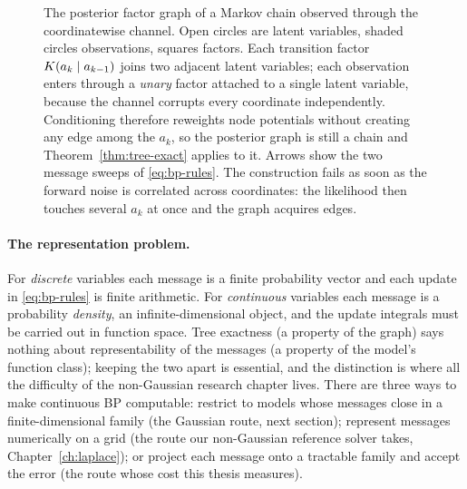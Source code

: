 \begin{figure}[t]\centering
{}
\caption[Posterior factor graph of a noised Markov chain]{The posterior factor
graph of a Markov chain observed through the coordinatewise channel. Open
circles are latent variables, shaded circles observations, squares factors. Each
transition factor $K(a_k \mid a_{k-1})$ joins two adjacent latent
variables; each observation enters through a \emph{unary} factor attached to a
single latent variable, because the channel corrupts every coordinate
independently. Conditioning therefore reweights node potentials without creating
any edge among the $a_k$, so the posterior graph is still a chain and
Theorem~\ref{thm:tree-exact} applies to it. Arrows show the two message sweeps
of \eqref{eq:bp-rules}. The construction fails as soon as the forward noise is
correlated across coordinates: the likelihood then touches several $a_k$ at
once and the graph acquires edges.}
\label{fig:posterior-factor-graph}
\end{figure}

\paragraph{The representation problem.} For \emph{discrete} variables
each message is a finite probability vector and each update in
\eqref{eq:bp-rules} is finite arithmetic. For \emph{continuous} variables
each message is a probability \emph{density}, an infinite-dimensional
object, and the update integrals must be carried out in function space.
Tree exactness (a property of the graph) says nothing about
representability of the messages (a property of the model's function
class); keeping the two apart is essential, and the distinction is where
all the difficulty of the non-Gaussian research chapter lives. There are
three ways to make continuous BP computable: restrict to models whose
messages close in a finite-dimensional family (the Gaussian route, next
section); represent messages numerically on a grid (the route our
non-Gaussian reference solver takes, Chapter~\ref{ch:laplace}); or
project each message onto a tractable family and accept the error (the
route whose cost this thesis measures).
